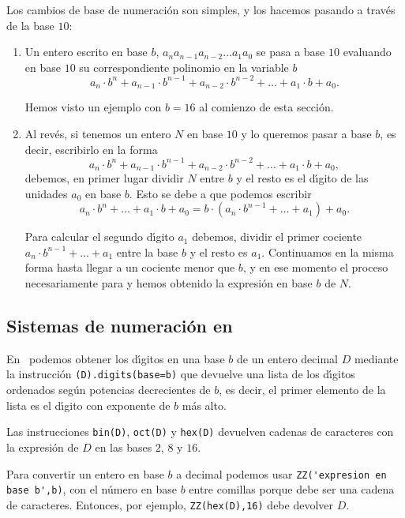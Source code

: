 Los cambios de base de numeraci\'on son simples, y los hacemos pasando a
trav\'es de la base $10$:
\begin{enumerate}
 \item Un entero escrito en base $b$, $a_na_{n-1}a_{n-2}\dots a_1a_0$ se pasa a
base $10$ evaluando en base $10$ su correspondiente  polinomio en la variable
$b$
 \[a_n\cdot b^{n}+a_{n-1}\cdot b^{n-1}+ a_{n-2}\cdot b^{n-2}+\dots+a_1\cdot
b+a_0.\]
 
 Hemos visto un ejemplo con $b=16$ al comienzo de esta secci\'on.
 
 \item Al rev\'es, si tenemos un entero $N$ en base $10$ y lo queremos pasar a
base $b$, es decir, escribirlo en la forma 
 \[a_n\cdot b^{n}+a_{n-1}\cdot b^{n-1}+ a_{n-2}\cdot b^{n-2}+\dots+a_1\cdot
b+a_0,\]
 \noindent debemos, en primer lugar dividir $N$ entre $b$ y el resto es el
d\'{\i}gito de las unidades $a_0$ en base $b$. Esto se debe a que podemos
escribir 
 \[a_n\cdot b^{n}+\dots+a_1\cdot b+a_0=b\cdot (a_n\cdot
b^{n-1}+\dots+a_1)+a_0.\]
 
 Para calcular el segundo d\'{\i}gito $a_1$ debemos,  dividir el primer cociente
$a_n\cdot b^{n-1}+\dots+a_1$ entre la base $b$ y el resto es $a_1.$ Continuamos
en la misma forma hasta llegar a un cociente menor que $b$, y en ese momento el
proceso necesariamente para y hemos obtenido la expresi\'on en base $b$ de $N$.
 
\end{enumerate}



\subsection{Sistemas de numeraci\'on en \sage}


En \sage\ podemos obtener los d\'{\i}gitos en una base $b$ de un entero decimal
$D$ mediante la instrucci\'on \lstinline|(D).digits(base=b)| que devuelve una
lista de los d\'{\i}gitos ordenados seg\'un potencias decrecientes de $b$, es
decir, el primer elemento de la lista es el d\'{\i}gito con exponente de $b$
m\'as alto. 

Las instrucciones \lstinline|bin(D)|, \lstinline|oct(D)| y \lstinline|hex(D)|
devuelven cadenas de caracteres con la expresi\'on de $D$ en las bases $2$, $8$
y
$16$.

Para convertir un entero en base $b$ a decimal podemos usar
\lstinline|ZZ('expresion en base b',b)|, con el n\'umero en base $b$ entre
comillas porque debe ser una cadena de caracteres. Entonces, por ejemplo, 
\lstinline|ZZ(hex(D),16)| debe devolver $D$.



